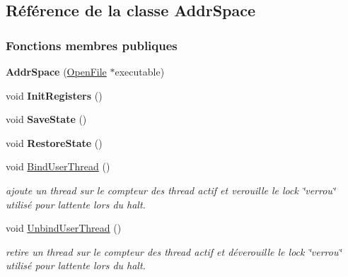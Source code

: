 \hypertarget{class_addr_space}{}\subsection{Référence de la classe Addr\+Space}
\label{class_addr_space}
\subsubsection*{Fonctions membres publiques}
\begin{DoxyCompactItemize}
\item 
\hypertarget{class_addr_space_a92150df1034dc2faa393f7b9bcef8851}{}\label{class_addr_space_a92150df1034dc2faa393f7b9bcef8851} 
{\bfseries Addr\+Space} (\hyperlink{class_open_file}{Open\+File} $\ast$executable)
\item 
\hypertarget{class_addr_space_ab0eb6814961508ac27437b235a9296fc}{}\label{class_addr_space_ab0eb6814961508ac27437b235a9296fc} 
void {\bfseries Init\+Registers} ()
\item 
\hypertarget{class_addr_space_afbdfe878dfdbc45c3fd0712ba49ebc68}{}\label{class_addr_space_afbdfe878dfdbc45c3fd0712ba49ebc68} 
void {\bfseries Save\+State} ()
\item 
\hypertarget{class_addr_space_ac874975e4df82801d99588c35ea8252a}{}\label{class_addr_space_ac874975e4df82801d99588c35ea8252a} 
void {\bfseries Restore\+State} ()
\item 
\hypertarget{class_addr_space_abeaa5e533f91a63f5e12d07103b580b2}{}\label{class_addr_space_abeaa5e533f91a63f5e12d07103b580b2} 
void \hyperlink{class_addr_space_abeaa5e533f91a63f5e12d07103b580b2}{Bind\+User\+Thread} ()
\begin{DoxyCompactList}\small\item\em ajoute un thread sur le compteur des thread actif et verouille le lock \char`\"{}verrou\char`\"{} utilisé pour l\textquotesingle{}attente lors du halt. \end{DoxyCompactList}\item 
\hypertarget{class_addr_space_aa9d31694a627661696305ced978f7421}{}\label{class_addr_space_aa9d31694a627661696305ced978f7421} 
void \hyperlink{class_addr_space_aa9d31694a627661696305ced978f7421}{Unbind\+User\+Thread} ()
\begin{DoxyCompactList}\small\item\em retire un thread sur le compteur des thread actif et déverouille le lock \char`\"{}verrou\char`\"{} utilisé pour l\textquotesingle{}attente lors du halt. \end{DoxyCompactList}\item 

\end{DoxyCompactItemize}
